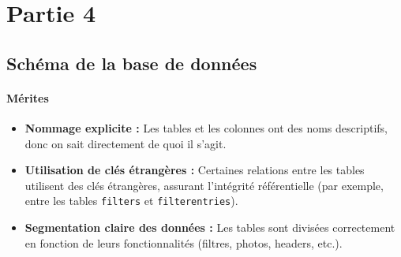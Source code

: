 \section{Partie 4}

\subsection{Schéma de la base de données}

\paragraph{Mérites}
\begin{itemize}
    \item \textbf{Nommage explicite :} Les tables et les colonnes ont des noms descriptifs, donc on sait directement de quoi il s'agit.
    \item \textbf{Utilisation de clés étrangères :} Certaines relations entre les tables utilisent des clés étrangères, assurant l'intégrité référentielle (par exemple, entre les tables \texttt{filters} et \texttt{filterentries}).
    \item \textbf{Segmentation claire des données :} Les tables sont divisées correctement en fonction de leurs fonctionnalités (filtres, photos, headers, etc.).
\end{itemize}

